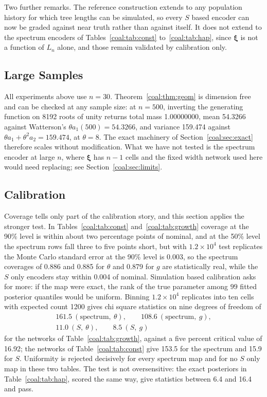 Two further remarks. The reference construction extends to any population history for which tree lengths can be simulated, so every $S$ based encoder can now be graded against near truth rather than against itself. It does not extend to the spectrum encoders of Tables~\ref{coal:tab:const} to~\ref{coal:tab:hap}, since $\bm{\xi}$ is not a function of $L_n$ alone, and those remain validated by calibration only.

\subsection{Large Samples}\label{coal:sec:large}

\begin{sloppypar}All experiments above use $n=30$. Theorem~\ref{coal:thm:geom} is dimension free and can be checked at any sample size: at $n=500$, inverting the generating function on 8192 roots of unity returns total mass 1.00000000, mean 54.3266 against Watterson's $\theta a_1(500)=54.3266$, and variance 159.474 against $\theta a_1+\theta^2a_2=159.474$, at $\theta=8$. The exact machinery of Section~\ref{coal:sec:exact} therefore scales without modification. What we have not tested is the spectrum encoder at large $n$, where $\bm{\xi}$ has $n-1$ cells and the fixed width network used here would need replacing; see Section~\ref{coal:sec:limits}.\end{sloppypar}

\subsection{Calibration}\label{coal:sec:calib}

Coverage tells only part of the calibration story, and this section applies the stronger test. In Tables~\ref{coal:tab:const} and~\ref{coal:tab:growth} coverage at the 90\% level is within about two percentage points of nominal, and at the 50\% level the spectrum rows fall three to five points short, but with $1.2\times10^4$ test replicates the Monte Carlo standard error at the 90\% level is 0.003, so the spectrum coverages of 0.886 and 0.885 for $\theta$ and 0.879 for $g$ are statistically real, while the $S$ only encoders stay within 0.004 of nominal. Simulation based calibration \citep{coal:talts2018} asks for more: if the map were exact, the rank of the true parameter among $99$ fitted posterior quantiles would be uniform. Binning $1.2\times10^4$ replicates into ten cells with expected count 1200 gives chi square statistics on nine degrees of freedom of
\[
\begin{gathered}
161.5\ (\text{spectrum},\ \theta),\qquad 108.6\ (\text{spectrum},\ g),\\
11.0\ (S,\ \theta),\qquad 8.5\ (S,\ g)
\end{gathered}
\]
for the networks of Table~\ref{coal:tab:growth}, against a five percent critical value of 16.92; the networks of Table~\ref{coal:tab:const} give 153.5 for the spectrum and 15.9 for $S$. Uniformity is rejected decisively for every spectrum map and for no $S$ only map in these two tables. The test is not oversensitive: the exact posteriors in Table~\ref{coal:tab:hap}, scored the same way, give statistics between 6.4 and 16.4 and pass.

